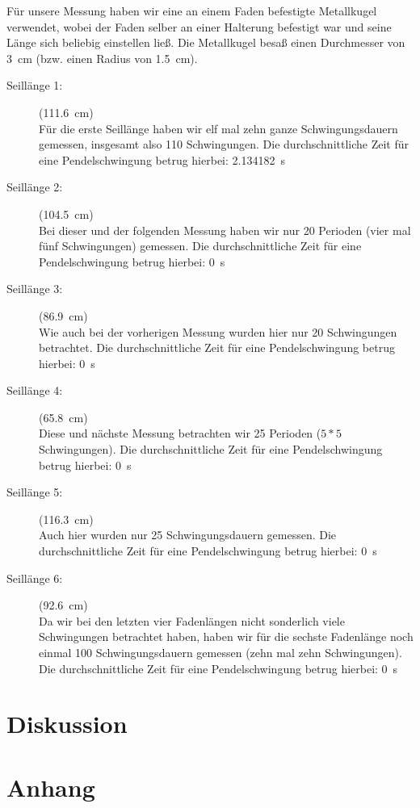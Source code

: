 \documentclass[11pt,a4paper,titlepage, ngerman]{article}
\begin{document}
		Für unsere Messung haben wir eine an einem Faden befestigte Metallkugel verwendet, wobei der Faden selber an einer Halterung befestigt war und seine Länge sich beliebig einstellen ließ.
		Die Metallkugel besaß einen Durchmesser von \SI{3}{cm} (bzw. einen Radius von \SI{1,5}{cm}).
		
		\begin{description}
			\item[Seillänge 1:](\SI{111,6}{cm})\\ 
			
			Für die erste Seillänge haben wir elf mal zehn ganze Schwingungsdauern gemessen, insgesamt also 110 Schwingungen. Die durchschnittliche Zeit für eine Pendelschwingung betrug hierbei: \SI{2.134182}{s}
			
			\item[Seillänge 2:](\SI{104,5}{cm})\\ 
			 
			Bei dieser und der folgenden Messung haben wir nur 20 Perioden (vier mal fünf Schwingungen) gemessen. Die durchschnittliche Zeit für eine Pendelschwingung betrug hierbei: \SI{0}{s}
			
			\item[Seillänge 3:](\SI{86,9}{cm})\\ 
			
			Wie auch bei der vorherigen Messung wurden hier nur 20 Schwingungen betrachtet. Die durchschnittliche Zeit für eine Pendelschwingung betrug hierbei: \SI{0}{s}		
			
			\item[Seillänge 4:](\SI{65,8}{cm})\\ 
			
			Diese und nächste Messung betrachten wir 25 Perioden ($5*5$Schwingungen). Die durchschnittliche Zeit für eine Pendelschwingung betrug hierbei: \SI{0}{s}
			
			\item[Seillänge 5:](\SI{116,3}{cm})\\ 
			
			Auch hier wurden nur 25 Schwingungsdauern gemessen. Die durchschnittliche Zeit für eine Pendelschwingung betrug hierbei: \SI{0}{s}
			
			\item[Seillänge 6:](\SI{92,6}{cm})\\ 
			
			Da wir bei den letzten vier Fadenlängen nicht sonderlich viele Schwingungen betrachtet haben, haben wir für die sechste Fadenlänge noch einmal 100 Schwingungsdauern gemessen (zehn mal zehn Schwingungen). 
			Die durchschnittliche Zeit für eine Pendelschwingung betrug hierbei: \SI{0}{s}
			
		\end{description}
		
	\section{Diskussion}	
		\label{Diskussion}		
		
	\section{Anhang}
		\label{Anhang}
	
\end{document}
